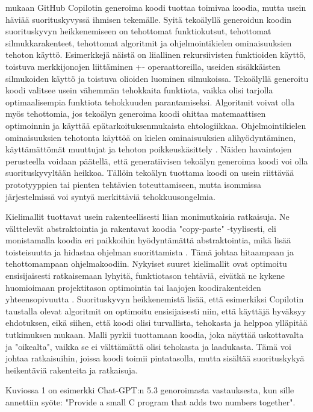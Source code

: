 \documentclass[utf8,bachelor]{gradu3}
\begin{document}
 \textcite{li_assessing_2024} mukaan GitHub Copilotin generoima koodi tuottaa toimivaa koodia, mutta usein häviää suorituskyvyssä ihmisen tekemälle. Syitä tekoälyllä generoidun koodin suorituskyvyn heikkenemiseen on tehottomat funktiokutsut, tehottomat silmukkarakenteet, tehottomat algoritmit ja ohjelmointikielen ominaisuuksien tehoton käyttö. Esimerkkejä näistä on liiallinen rekursiivisten funktioiden käyttö, toistuva merkkijonojen liittäminen +- operaattoreilla, useiden sisäkkäisten silmukoiden käyttö ja toistuva olioiden luominen silmukoissa. Tekoälyllä generoitu koodi valitsee usein vähemmän tehokkaita funktiota, vaikka olisi tarjolla optimaalisempia funktiota tehokkuuden parantamiseksi. Algoritmit voivat olla myös tehottomia, jos tekoälyn generoima koodi ohittaa matemaattisen optimoinnin ja käyttää epätarkoituksenmukaista ehtologiikkaa. Ohjelmointikielen ominaisuuksien tehotonta käyttöä on kielen ominaisuuksien alihyödyntäminen, käyttämättömät muuttujat ja tehoton poikkeuskäsittely \parencite{li_assessing_2024}. Näiden havaintojen perusteella voidaan päätellä, että generatiivisen tekoälyn generoima koodi voi olla suorituskyvyltään heikkoa. Tällöin tekoälyn tuottama koodi on usein riittävää prototyyppien tai pienten tehtävien toteuttamiseen, mutta isommissa järjestelmissä voi syntyä merkittäviä tehokkuusongelmia.

Kielimallit tuottavat usein rakenteellisesti liian monimutkaisia ratkaisuja. Ne välttelevät abstraktointia ja rakentavat koodia "copy-paste" -tyylisesti, eli monistamalla koodia eri paikkoihin hyödyntämättä abstraktointia, mikä lisää toisteisuutta ja hidastaa ohjelman suorittamista \parencite{gu_challenges_2025}. Tämä johtaa hitaampaan ja tehottomampaan ohjelmakoodiin. Nykyiset suuret kielimallit ovat optimoitu ensisijaisesti ratkaisemaan lyhyitä, funktiotason tehtäviä, eivätkä ne kykene huomioimaan projektitason optimointia tai laajojen koodirakenteiden yhteensopivuutta \parencite{gu_challenges_2025}. Suorituskyvyn heikkenemistä lisää, että esimerkiksi Copilotin taustalla olevat algoritmit on optimoitu ensisijaisesti niin, että käyttäjä hyväksyy ehdotuksen, eikä siihen, että koodi olisi turvallista, tehokasta ja helppoa ylläpitää \textcite{fu_security_2025} tutkimuksen mukaan. Malli pyrkii tuottamaan koodia, joka näyttää uskottavalta ja "oikealta", vaikka se ei välttämättä olisi tehokasta ja laadukasta. Tämä voi johtaa ratkaisuihin, joissa koodi toimii pintatasolla, mutta sisältää suorituskykyä heikentäviä rakenteita ja ratkaisuja.

Kuviossa 1 on esimerkki Chat-GPT:n 5.3 genoroimasta vastauksesta, kun sille annettiin syöte: "Provide a small C program that adds two numbers together".
\end{document}
